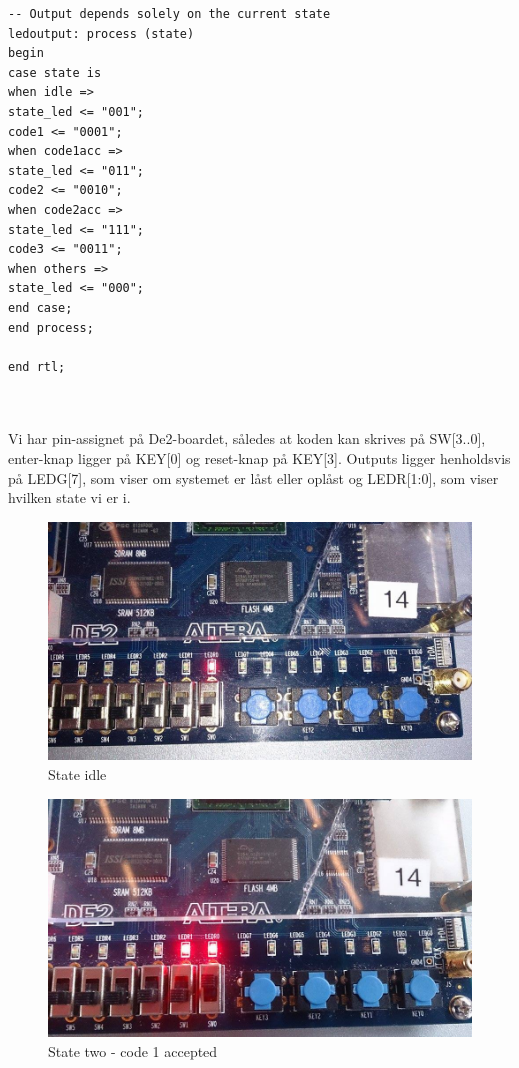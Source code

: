 \begin{enumerate}
\begin{lstlisting}[caption={VHDL koden for kodelås},label={lst:code_lock}]
-- Output depends solely on the current state
ledoutput: process (state)
begin
case state is
when idle =>
state_led <= "001";
code1 <= "0001";
when code1acc =>
state_led <= "011";
code2 <= "0010";
when code2acc =>
state_led <= "111";
code3 <= "0011";
when others =>
state_led <= "000";
end case;
end process;

end rtl;



\end{lstlisting}

Vi har pin-assignet på De2-boardet, således at koden kan skrives på SW[3..0], enter-knap ligger på KEY[0] og reset-knap på KEY[3]. Outputs ligger henholdsvis på LEDG[7], som viser om systemet er låst eller oplåst og LEDR[1:0], som viser hvilken state vi er i. 

\begin{figure}[h]
	\centering
	\includegraphics[scale=0.45]{pictures/Oevelse7/opg2/StateIdle.JPG}
	\caption{State idle}
	\label{fig:}
\end{figure}
		
\begin{figure}[h]
	\centering
	\includegraphics[scale=0.45]{pictures/Oevelse7/opg2/StateTwo.JPG}
	\caption{State two - code 1 accepted}
	\label{fig:}
\end{figure}


\end{enumerate}

